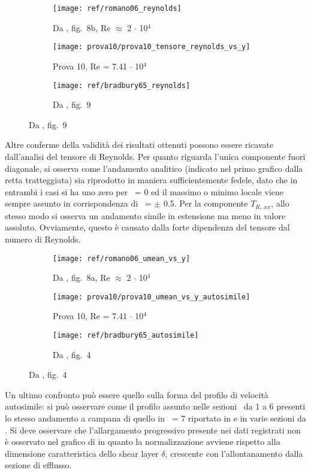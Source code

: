 \documentclass{article} %
\newcommand{\xd}{\nicefrac{\textrm{x}}{\textrm{D}}\ }
\newcommand{\yd}{\nicefrac{\textrm{y}}{\textrm{D}}\ }
\begin{document}
\begin{figure}[h!]
	\centering
	\begin{subfigure}{0.3\textwidth}
		\texttt{[image: ref/romano06\_reynolds]}
		\caption{Da \cite{falchi09}, fig.~8b, Re $\approx$ 2 $\cdot$ 10$^4$}
	\end{subfigure}
	\begin{subfigure}{0.3\textwidth}
		\texttt{[image: prova10/prova10\_tensore\_reynolds\_vs\_y]}
		\caption{Prova 10, Re = 7.41 $\cdot$ 10$^4$}
	\end{subfigure}
	\begin{subfigure}{0.3\textwidth}
		\texttt{[image: ref/bradbury65\_reynolds]}
		\caption{Da \cite{bradbury65}, fig.~9}
	\end{subfigure}
\end{figure}\par
Altre conferme della validità dei risultati ottenuti possono essere ricavate dall'analisi del tensore di Reynolds. Per quanto riguarda l'unica componente fuori diagonale, si osserva come l'andamento analitico (indicato nel primo grafico dalla retta tratteggiata) sia riprodotto in maniera sufficientemente fedele, dato che in entrambi i casi si ha uno zero per \yd = 0 ed il massimo o minimo locale viene sempre assunto in corrispondenza di \yd = $\pm$ 0.5. Per la componente $T_{R,\ xx}$, allo stesso modo si osserva un andamento simile in estensione ma meno in valore assoluto. Ovviamente, questo è causato dalla forte dipendenza del tensore dal numero di Reynolds.\par
\begin{figure}[h!]
	\centering
	\begin{subfigure}{0.3\textwidth}
		\texttt{[image: ref/romano06\_umean\_vs\_y]}
		\caption{Da \cite{falchi09}, fig.~8a, Re $\approx$ 2 $\cdot$ 10$^4$}
	\end{subfigure}
	\begin{subfigure}{0.3\textwidth}
		\texttt{[image: prova10/prova10\_umean\_vs\_y\_autosimile]}
		\caption{Prova 10, Re = 7.41 $\cdot$ 10$^4$}
	\end{subfigure}
	\begin{subfigure}{0.3\textwidth}
		\texttt{[image: ref/bradbury65\_autosimile]}
		\caption{Da \cite{bradbury65}, fig.~4}
	\end{subfigure}
\end{figure}\par
Un ultimo confronto può essere quello sulla forma del profilo di velocità autosimile: si può osservare come il profilo assunto nelle sezioni \xd da 1 a 6 presenti lo stesso andamento a campana di quello in \xd = 7 riportato in \cite{falchi09} e in varie sezioni da \cite{bradbury65}. Si deve osservare che l'allargamento progressivo presente nei dati registrati non è osservato nel grafico di \cite{bradbury65} in quanto la normalizzazione avviene rispetto alla dimensione caratteristica dello shear layer $\delta$, crescente con l'allontanamento dalla sezione di efflusso.
\end{document}
